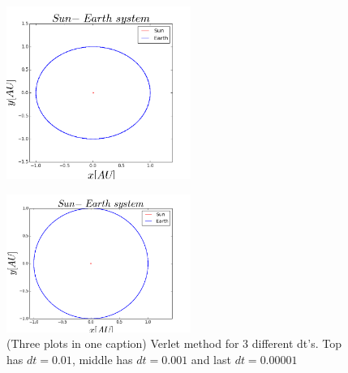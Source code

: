 \documentclass[twocolumn]{article}
\begin{document}
\begin{figure}[H]
\centering
\includegraphics[width=6cm]{Verlet_0_001.png}
\end{figure}
\begin{figure}[H]
\centering
\includegraphics[width=6cm]{Verlet_0_00001.png}
\caption{(Three plots in one caption) Verlet method for 3 different dt's. Top has $dt = 0.01$, middle has $dt = 0.001$ and last $dt =0.00001$}
\end{figure}
\end{document}

